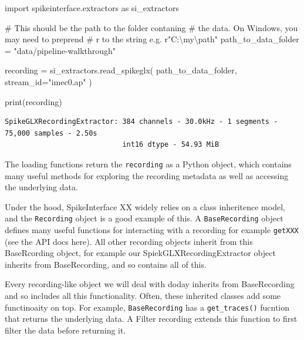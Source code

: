 \documentclass[
  letterpaper,
  DIV=11,
  numbers=noendperiod]{scrreprt}
\newenvironment{Shaded}{\begin{snugshade}}{\end{snugshade}}
\newcommand{\BuiltInTok}[1]{\textcolor[rgb]{0.00,0.23,0.31}{#1}}
\newcommand{\CommentTok}[1]{\textcolor[rgb]{0.37,0.37,0.37}{#1}}
\newcommand{\ImportTok}[1]{\textcolor[rgb]{0.00,0.46,0.62}{#1}}
\newcommand{\NormalTok}[1]{\textcolor[rgb]{0.00,0.23,0.31}{#1}}
\newcommand{\OperatorTok}[1]{\textcolor[rgb]{0.37,0.37,0.37}{#1}}
\newcommand{\StringTok}[1]{\textcolor[rgb]{0.13,0.47,0.30}{#1}}
\begin{document}
\begin{Shaded}
\begin{Highlighting}[]
\ImportTok{import}\NormalTok{ spikeinterface.extractors }\ImportTok{as}\NormalTok{ si\_extractors}

\CommentTok{\# This should be the path to the folder contaning}
\CommentTok{\# the data. On Windows, you may need to preprend}
\CommentTok{\# r to the string e.g. r"C:\textbackslash{}my\textbackslash{}path"}
\NormalTok{path\_to\_data\_folder }\OperatorTok{=} \StringTok{"data/pipeline{-}walkthrough"}

\NormalTok{recording }\OperatorTok{=}\NormalTok{ si\_extractors.read\_spikeglx(}
\NormalTok{    path\_to\_data\_folder,}
\NormalTok{    stream\_id}\OperatorTok{=}\StringTok{"imec0.ap"}
\NormalTok{)}

\BuiltInTok{print}\NormalTok{(recording)}
\end{Highlighting}
\end{Shaded}

\begin{verbatim}
SpikeGLXRecordingExtractor: 384 channels - 30.0kHz - 1 segments - 75,000 samples - 2.50s 
                            int16 dtype - 54.93 MiB
\end{verbatim}

The loading functions return the \texttt{recording} as a Python object,
which contains many useful methods for exploring the recording metadata
as well as accessing the underlying data.

\begin{tcolorbox}[enhanced jigsaw, arc=.35mm, bottomrule=.15mm, bottomtitle=1mm, breakable, colback=white, colbacktitle=quarto-callout-note-color!10!white, colframe=quarto-callout-note-color-frame, coltitle=black, left=2mm, leftrule=.75mm, opacityback=0, opacitybacktitle=0.6, rightrule=.15mm, title=\textcolor{quarto-callout-note-color}{\faInfo}\hspace{0.5em}{Details on class inheritence in SpikeInterface}, titlerule=0mm, toprule=.15mm, toptitle=1mm]

Under the hood, SpikeInterface XX widely relies on a class inheritence
model, and the \texttt{Recording} object is a good example of this. A
\texttt{BaseRecording} object defines many useful functions for
interacting with a recording for example \texttt{getXXX} (see the API
docs here). All other recording objects inherit from this BaseRcording
object, for example our SpiekGLXRecordingExtractor object inherits from
BaseRecording, and so contains all of this.

Every recording-like object we will deal with doday inherits from
BaseRecording and so includes all this functionality. Often, these
inherited classes add some functinoaity on top. For example,
\texttt{BaseRecording} has a \texttt{get\_traces()} fucntion that
returns the underlying data. A Filter recording extends this function to
first filter the data before returning it.

\end{tcolorbox}
\end{document}
